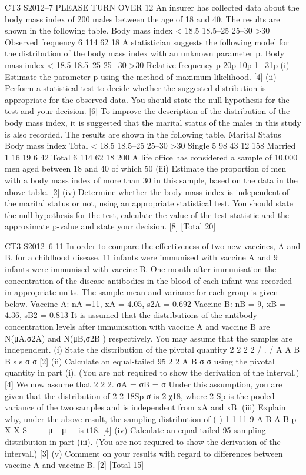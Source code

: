 CT3 S2012–7 PLEASE TURN OVER
12 An insurer has collected data about the body mass index of 200 males between the
age of 18 and 40. The results are shown in the following table.
Body mass index < 18.5 18.5–25 25–30 >30
Observed frequency 6 114 62 18
A statistician suggests the following model for the distribution of the body mass index
with an unknown parameter p.
Body mass index < 18.5 18.5–25 25−30 >30
Relative frequency p 20p 10p 1−31p
(i) Estimate the parameter p using the method of maximum likelihood. [4]
(ii) Perform a statistical test to decide whether the suggested distribution is
appropriate for the observed data. You should state the null hypothesis for the
test and your decision. [6]
To improve the description of the distribution of the body mass index, it is suggested
that the marital status of the males in this study is also recorded. The results are
shown in the following table.
Marital Status Body mass index Total
< 18.5 18.5–25 25–30 >30
Single 5 98 43 12 158
Married 1 16 19 6 42
Total 6 114 62 18 200
A life office has considered a sample of 10,000 men aged between 18 and 40 of which
50%
(iii) Estimate the proportion of men with a body mass index of more than 30 in this
sample, based on the data in the above table. [2]
(iv) Determine whether the body mass index is independent of the marital status or
not, using an appropriate statistical test. You should state the null hypothesis
for the test, calculate the value of the test statistic and the approximate
p-value and state your decision. [8]
[Total 20]

  CT3 S2012–6
11 In order to compare the effectiveness of two new vaccines, A and B, for a childhood
disease, 11 infants were immunised with vaccine A and 9 infants were immunised
with vaccine B. One month after immunisation the concentration of the disease
antibodies in the blood of each infant was recorded in appropriate units. The sample
mean and variance for each group is given below.
Vaccine A: nA =11, xA = 4.05, s2A = 0.692
Vaccine B: nB = 9, xB = 4.36, sB2 = 0.813
It is assumed that the distributions of the antibody concentration levels after
immunisation with vaccine A and vaccine B are N(μA,σ2A) and N(μB,σ2B )
respectively. You may assume that the samples are independent.
(i) State the distribution of the pivotal quantity
2 2
2 2
/ .
/
  A A
B B
s
s
σ
σ
[2]
(ii) Calculate an equal-tailed 95%
2
2
A
B
σ
σ
using the
pivotal quantity in part (i). (You are not required to show the derivation of the
                               interval.) [4]
We now assume that 2 2 2. σA = σB = σ Under this assumption, you are given that the
distribution of
2
2
18Sp
σ
is 2
χ18, where 2
Sp is the pooled variance of the two samples and
is independent from xA and xB.
(iii) Explain why, under the above result, the sampling distribution of
( )
1 1
11 9
A B A B
p
X X
S
− − μ −μ
+
  is t18. [4]
(iv) Calculate an equal-tailed 95%
sampling distribution in part (iii). (You are not required to show the
                                      derivation of the interval.) [3]
(v) Comment on your results with regard to differences between vaccine A and
vaccine B. [2]
[Total 15]
